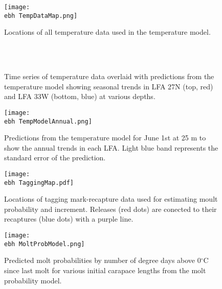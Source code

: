 \documentclass[11pt]{article}
\newcommand{\ebh}{\string~/bio.data/bio.lobster/figures/LFA2733Framework2018/} %
\begin{document}
\setcounter{figure}{137} 

    \begin{figure}
    \centering
        \texttt{[image: \\ebh TempDataMap.png]}
        \caption{Locations of all temperature data used in the temperature model.}

    \end{figure}

        \begin{figure}
        \centering
                \\
                \\
        
         \caption{Time series of temperature data overlaid with predictions from the temperature model showing seasonal trends in LFA 27N (top, red) and LFA 33W (bottom, blue) at various depths.}
        \end{figure}



    \begin{figure}
    \centering
        \texttt{[image: \\ebh TempModelAnnual.png]}
        \caption{Predictions from the temperature model for June 1st at 25 m to show the annual trends in each LFA. Light blue band represents the standard error of the prediction.}

    \end{figure}
  
    \begin{figure}
    \centering
        \texttt{[image: \\ebh TaggingMap.pdf]}
        \caption{Locations of tagging mark-recapture data used for estimating moult probability and increment. Releases (red dots) are conected to their recaptures (blue dots) with a purple line.}

    \end{figure}

    \begin{figure}
    \centering
        \texttt{[image: \\ebh MoltProbModel.png]}
        \caption{Predicted molt probabilities by number of degree days above 0$^{\circ}$C since last molt for various initial carapace lengths from the molt probability model.}

    \end{figure}
\end{document}
